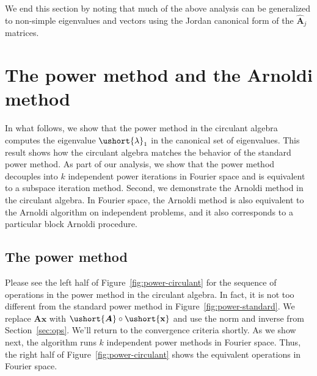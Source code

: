 \documentclass[1p,authoryear,letterpaper]{elsarticle}
\providecommand{\mat}{\boldsymbol}
\renewcommand{\vec}{\mathbf}
\providecommand{\mA}{\ensuremath{\mat{A}}}
\providecommand{\mhat}[1]{\ensuremath{\mat{\hat{#1}}}}
\providecommand{\mAhat}{\mhat{A}}
\providecommand{\vx}{\ensuremath{\vec{x}}}
\newcommand{\cel}[1]{\ushort{#1}}
\newcommand{\celm}[1]{\cel{\mat{#1}}}
\newcommand{\celv}[1]{\cel{\vec{#1}}}
\newcommand{\clambda}{\ensuremath{\cel{\lambda}}}
\newcommand{\cvx}{\ensuremath{\celv{x}}}
\providecommand{\cmA}{\ensuremath{\celm{A}}}
\begin{document}
We end this section by noting that much of the above analysis can be generalized
to non-simple eigenvalues and vectors using
the Jordan canonical form of the $\mAhat_j$ matrices.


\section{The power method and the Arnoldi method}
\label{sec:algs}


In what follows, we show that the power method in
the circulant algebra computes the eigenvalue $\clambda_1$
in the canonical set of eigenvalues.  This result shows
how the circulant algebra matches the behavior of
the standard power method.   As part of our analysis, we show
that the power method decouples into $k$ independent
power iterations in Fourier space and is equivalent
to a subspace iteration method.  Second,
we demonstrate the Arnoldi method in the circulant algebra.
In Fourier space, the Arnoldi method is also equivalent to
the Arnoldi algorithm on independent problems, and it also corresponds
to a particular block Arnoldi procedure.



\subsection{The power method}
\label{sec:power}

Please see the left half of Figure~\ref{fig:power-circulant}
for the sequence of operations in the power method in the
circulant algebra.
In fact, it is not too different from the standard
power method in Figure~\ref{fig:power-standard}.  We replace
$\mA \vx$ with $\cmA \circ \cvx$ and use the norm and
inverse from Section~\ref{sec:ops}. We'll return
to the convergence criteria shortly.
As we show next, the algorithm runs
$k$ independent power methods in Fourier space.  Thus,
the right half of Figure~\ref{fig:power-circulant} shows
the equivalent operations in Fourier space.
\end{document}
